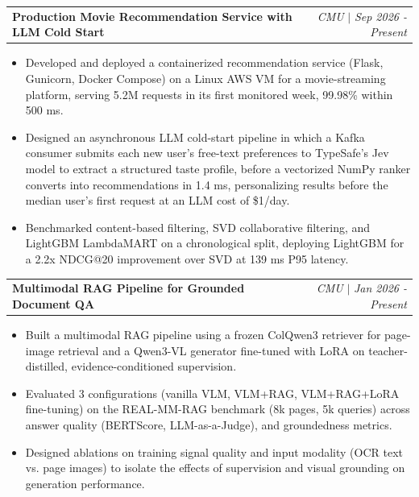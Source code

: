 \documentclass[letterpaper,11pt]{article}
\makeatletter
\newcommand{\resumeItem}[1]{
  \item\small{
    {#1 \vspace{-2pt}}
  }
}
\newcommand{\resumeProjectHeading}[2]{
    \item\small
    \begin{tabular*}{0.97\textwidth}{l@{\extracolsep{\fill}}r}
      \small#1 & #2 \\
    \end{tabular*}\vspace{-7pt}
}
\newcommand{\resumeItemListStart}{\begin{itemize}}
\newcommand{\resumeItemListEnd}{\end{itemize}\vspace{-5pt}}
\makeatother
\begin{document}
\resumeProjectHeading
  {\textbf{Production Movie Recommendation Service with LLM Cold Start}}{\emph{CMU} $|$ \textit{Sep 2026 - Present}}
  \resumeItemListStart
    \resumeItem{Developed and deployed a containerized recommendation service (Flask, Gunicorn, Docker Compose) on a Linux AWS VM for a movie-streaming platform, serving 5.2M requests in its first monitored week, 99.98\% within 500 ms.}
    \resumeItem{Designed an asynchronous LLM cold-start pipeline in which a Kafka consumer submits each new user's free-text preferences to TypeSafe's Jev model to extract a structured taste profile, before a vectorized NumPy ranker converts into recommendations in 1.4 ms, personalizing results before the median user's first request at an LLM cost of \$1/day.}
    \resumeItem{Benchmarked content-based filtering, SVD collaborative filtering, and LightGBM LambdaMART on a chronological split, deploying LightGBM for a 2.2x NDCG@20 improvement over SVD at 139 ms P95 latency.}
  \resumeItemListEnd

    
\resumeProjectHeading
    {\textbf{Multimodal RAG Pipeline for Grounded Document QA}}{\emph{CMU} $|$ \textit{Jan 2026 - Present}}
    \resumeItemListStart
      \resumeItem{Built a multimodal RAG pipeline using a frozen ColQwen3 retriever for page-image retrieval and a Qwen3-VL generator fine-tuned with LoRA on teacher-distilled, evidence-conditioned supervision.}
      \resumeItem{Evaluated 3 configurations (vanilla VLM, VLM+RAG, VLM+RAG+LoRA fine-tuning) on the REAL-MM-RAG benchmark (8k pages, 5k queries) across answer quality (BERTScore, LLM-as-a-Judge), and groundedness metrics.}
      \resumeItem{Designed ablations on training signal quality and input modality (OCR text vs. page images) to isolate the effects of supervision and visual grounding on generation performance.}
    \resumeItemListEnd
\end{document}
